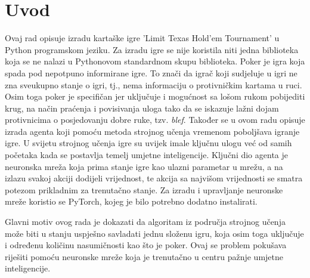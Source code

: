 \section{Uvod}
Ovaj rad opisuje izradu kartaške igre 'Limit Texas Hold'em Tournament' u Python programskom jeziku. Za izradu igre se nije koristila niti jedna biblioteka koja se ne nalazi u Pythonovom standardnom skupu biblioteka. Poker je igra koja spada pod nepotpuno informirane igre. To znači da igrač koji sudjeluje u igri ne zna sveukupno stanje o igri, tj., nema informaciju o protivničkim kartama u ruci. Osim toga poker je specifičan jer uključuje i mogućnost sa lošom rukom pobijediti krug, na način praćenja i povisivanja uloga tako da se iskazuje lažni dojam protivnicima o posjedovanju dobre ruke, tzv. \emph{blef}. Također se u ovom radu opisuje izrada agenta koji pomoću metoda strojnog učenja vremenom poboljšava igranje igre. U svijetu strojnog učenja igre su uvijek imale ključnu ulogu već od samih početaka kada se postavlja temelj umjetne inteligencije. Ključni dio agenta je neuronska mreža koja prima stanje igre kao ulazni parametar u mrežu, a na izlazu svakoj akciji dodijeli vrijednost, te akcija sa najvišom vrijednosti se smatra potezom prikladnim za trenutačno stanje. Za izradu i upravljanje neuronske mreže koristio se PyTorch, kojeg je bilo potrebno dodatno instalirati. 

Glavni motiv ovog rada je dokazati da algoritam iz područja strojnog učenja može biti u stanju uspješno savladati jednu složenu igru, koja osim toga uključuje i određenu količinu nasumičnosti kao što je poker. Ovaj se problem pokušava riješiti pomoću neuronske mreže koja je trenutačno u centru pažnje umjetne inteligencije. 